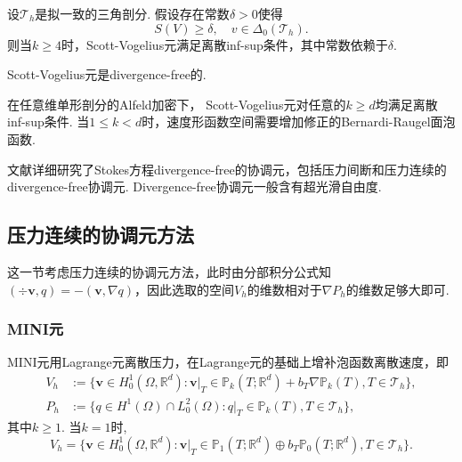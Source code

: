 \begin{lemma}
设$\mathcal T_h$是拟一致的三角剖分. 假设存在常数$\delta>0$使得
\begin{equation*}
S(V)\geq\delta,\quad v\in\Delta_0(\mathcal T_h).
\end{equation*}
则当$k\geq4$时，Scott-Vogelius元满足离散inf-sup条件，其中常数依赖于$\delta$.
\end{lemma}

Scott-Vogelius元是divergence-free的.

\begin{remark}\rm
在任意维单形剖分的Alfeld加密下，	Scott-Vogelius元对任意的$k\geq d$均满足离散inf-sup条件\cite{GuzmanNeilan2018,Zhang2005,ArnoldQin1992}. 当$1\leq k<d$时，速度形函数空间需要增加修正的Bernardi-Raugel面泡函数.
\end{remark}

\begin{remark}\rm
文献\cite{ChenHuang2024}详细研究了Stokes方程divergence-free的协调元，包括压力间断和压力连续的divergence-free协调元. Divergence-free协调元一般含有超光滑自由度.
\end{remark}




\subsection{压力连续的协调元方法}
这一节考虑压力连续的协调元方法，此时由分部积分公式知$(\div\boldsymbol{v},q)=-(\boldsymbol{v}, \nabla q)$，因此选取的空间$V_h$的维数相对于$\nabla P_h$的维数足够大即可.

\subsubsection{MINI元}

MINI元\cite{ArnoldBrezziFortin1984}用Lagrange元离散压力，在Lagrange元的基础上增补泡函数离散速度，即
\begin{align*}
V_{h}&:=\{\boldsymbol{v}\in H_{0}^{1}(\Omega,\mathbb{R}^{d}): \boldsymbol{v}|_T\in \mathbb P_k(T;\mathbb{R}^{d})+b_T\nabla\mathbb P_k(T), T\in \mathcal{T}_h\},
\\
P_{h}&:=\{q\in H^{1}(\Omega)\cap L_{0}^2(\Omega): q|_T\in \mathbb P_{k}(T), T\in \mathcal{T}_h\},
\end{align*}
其中$k\geq1$. 当$k=1$时,
\begin{equation*}
V_{h}=\{\boldsymbol{v}\in H_{0}^{1}(\Omega,\mathbb{R}^{d}): \boldsymbol{v}|_T\in \mathbb P_1(T;\mathbb{R}^{d})\oplus b_T\mathbb P_0(T;\mathbb{R}^{d}), T\in \mathcal{T}_h\}.
\end{equation*}

